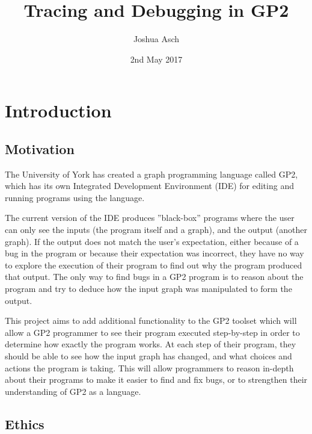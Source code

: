 \documentclass[authoryearcitations]{UoYCSproject}
\author{Joshua Asch}
\title{Tracing and Debugging in GP2}
\date{2nd May 2017}
\begin{document}
\maketitle

\listoffigures
\begingroup
\let\clearpage\relax
\listoftables
\endgroup

\clearpage


\chapter{Introduction}
\label{cha:Introduction}

\section{Motivation}
\label{sec:Motivation}

The University of York has created a graph programming language called GP2,
which has its own Integrated Development Environment (IDE) for editing and
running programs using the language.

The current version of the IDE produces ''black-box'' programs where the user
can only see the inputs (the program itself and a graph), and the output (another
graph). If the output does not match the user's expectation, either because of
a bug in the program or because their expectation was incorrect, they have no
way to explore the execution of their program to find out why the program
produced that output. The only way to find bugs in a GP2 program is to reason
about the program and try to deduce how the input graph was manipulated to form
the output.

This project aims to add additional functionality to the GP2 toolset which will
allow a GP2 programmer to see their program executed step-by-step in order to
determine how exactly the program works. At each step of their program, they
should be able to see how the input graph has changed, and what choices and
actions the program is taking. This will allow programmers to reason in-depth
about their programs to make it easier to find and fix bugs, or to strengthen
their understanding of GP2 as a language.


\section{Ethics}
\label{sec:Ethics}
\end{document}
